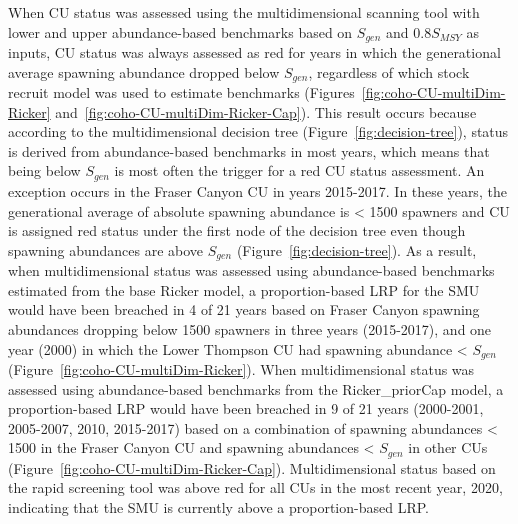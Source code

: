 \documentclass[11pt]{book}
\begin{document}
When CU status was assessed using the multidimensional scanning tool with lower and upper abundance-based benchmarks based on \(S_{gen}\) and 0.8\(S_{MSY}\) as inputs, CU status was always assessed as red for years in which the generational average spawning abundance dropped below \(S_{gen}\), regardless of which stock recruit model was used to estimate benchmarks (Figures~\ref{fig:coho-CU-multiDim-Ricker} and~\ref{fig:coho-CU-multiDim-Ricker-Cap}). This result occurs because according to the multidimensional decision tree (Figure~\ref{fig:decision-tree}), status is derived from abundance-based benchmarks in most years, which means that being below \(S_{gen}\) is most often the trigger for a red CU status assessment. An exception occurs in the Fraser Canyon CU in years 2015-2017. In these years, the generational average of absolute spawning abundance is \textless{} 1500 spawners and CU is assigned red status under the first node of the decision tree even though spawning abundances are above \(S_{gen}\) (Figure~\ref{fig:decision-tree}). As a result, when multidimensional status was assessed using abundance-based benchmarks estimated from the base Ricker model, a proportion-based LRP for the SMU would have been breached in 4 of 21 years based on Fraser Canyon spawning abundances dropping below 1500 spawners in three years (2015-2017), and one year (2000) in which the Lower Thompson CU had spawning abundance \textless{} \(S_{gen}\) (Figure~\ref{fig:coho-CU-multiDim-Ricker}). When multidimensional status was assessed using abundance-based benchmarks from the Ricker\_priorCap model, a proportion-based LRP would have been breached in 9 of 21 years (2000-2001, 2005-2007, 2010, 2015-2017) based on a combination of spawning abundances \textless{} 1500 in the Fraser Canyon CU and spawning abundances \textless{} \(S_{gen}\) in other CUs (Figure~\ref{fig:coho-CU-multiDim-Ricker-Cap}). Multidimensional status based on the rapid screening tool was above red for all CUs in the most recent year, 2020, indicating that the SMU is currently above a proportion-based LRP.
\end{document}
